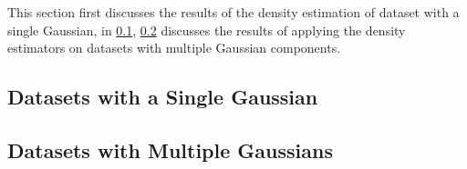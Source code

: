This section first discusses the results of the density estimation of dataset with a single Gaussian, in \cref{s:discussion:singleGaussian}, \cref{s:discussion:multipleGaussians} discusses the results of applying the density estimators on datasets with multiple Gaussian components.

\subsection{Datasets with a Single Gaussian}
	\label{s:discussion:singleGaussian}
	


\subsection{Datasets with Multiple Gaussians}
	\label{s:discussion:multipleGaussians}
	

